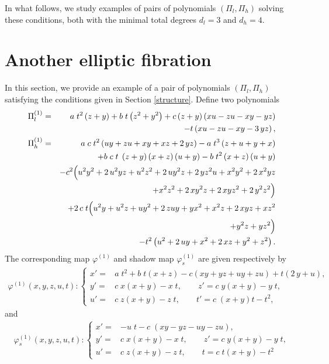 \documentclass[reqno]{amsart}
\numberwithin{equation}{section}
\numberwithin{figure}{section}
\begin{document}
In what follows, we study examples of pairs of polynomials $(\Pi_l, \Pi_h)$
solving these conditions, both with the minimal total degrees $d_l=3$ and
$d_h=4$.

\section{Another elliptic fibration}
\label{new_one}
In this section, we provide an example of a pair of polynomials $(\Pi_l, \Pi_h)$ satisfying the conditions given in Section \ref{structure}.
Define two polynomials
\begin{eqnarray*}
  \Pi_l^{(1)} &=& a\; {t}^{2} \left( z+y \right) + b\; t \left( {z}^{2}
+{y}^{2} \right)   + c \left( z+y \right)  \left( xu-zu-xy-yz \right) \\
&&-t \left( xu-zu-xy-    3\,yz \right),
  \\
 \Pi_h^{(1)} &=&  
a\;c\; t^2 \left( uy+zu+xy+xz+2\,yz \right) 
-a\;{t}^{3} \left( z+u+y+x \right) \\
&&+b\;c\;t\; \left( z+y \right)  \left( x+z \right)  \left( u+y \right) 
- b\;{t}^{2} \left( x+z \right)  \left( u+y \right)\\
&&  
- c^2 \Bigl( {u}^{2}{y}^{2}+2\,{u}^{2}yz+{u}^{2}{z}^{2}+2\,u{y}^{2}z
+2\,y{z}^{2}u+{x}^{2}{y}^{2}+2\,{x}^{2}yz\\
&&\qquad +{x}^{2}{z}^{2}
+2\,x{y}^{2}z+2\,xy{z}^{2}+2\,{y}^{2}{z}^{2} \Bigr) \\
&&
+2\,c\;t \Bigl( {u}^{2}y+{u}^{2}z+u{y}^{2}+2\,zuy+y{x}^{2}+{x}^{2}z+2\,xyz
+x{z}^{2}\\
&&\qquad +{y}^{2}z+y{z}^{2} \Bigr)\\
&&-{t}^{2} \left( {u}^{2}+2\,uy+{x}^{2}+2\,xz+{y}^{2}+{z}^{2} \right).
\end{eqnarray*}
The corresponding map $\varphi^{(1)} $ and  shadow map
$\varphi_s^{(1)} $ are given respectively  by
\begin{eqnarray}
\varphi^{(1)}(x, y, z, u, t):\begin{cases}
x' =& a\;{t}^{2}+b\; t \left( x+z \right) 
-c \left( xy+yz+uy+zu \right) +t \left( 2\,y+u \right) ,\\
y' =& c\;x \left( x+y \right) -x\;t,\qquad
z' = c\; y \left( x+y \right) -y\; t, \\
 u' =& c\; z \left( x+y \right) -z\; t, \qquad
t' = c\; \left( x+y \right) t-{t}^{2},
\end{cases}
\end{eqnarray}
and 
\begin{eqnarray} 
\varphi_s^{(1)}(x, y, z, u, t):\begin{cases}
 x' =& -u\; t -  c\; \left( xy-yz-uy-zu \right)  ,\\
y' =& c\;x \left( x+y \right)  - x\;t ,\qquad
z' =  c\;y \left( x+y \right) - y\; t, \\
u' =& c\; z \left(    x+y \right) - z\; t,\qquad
t =  c\; t \left( x+y \right) - {t}^{2}
\end{cases}
\end{eqnarray}
\end{document}
